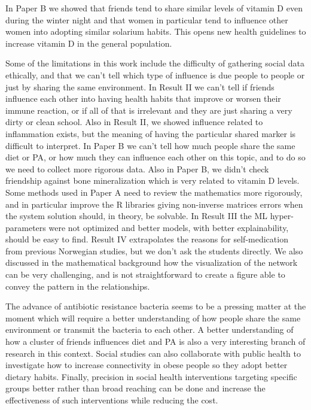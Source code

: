 In Paper B we showed that friends tend to share similar levels of vitamin D even during the winter night and that women in particular tend to influence other women into adopting similar solarium habits. This opens new health guidelines to increase vitamin D in the general population.


Some of the limitations in this work include the difficulty of gathering social data ethically, and that we can't tell which type of influence is due people to people or just by sharing the same environment. In Result II we can't tell if friends influence each other into having health habits that improve or worsen their immune reaction, or if all of that is irrelevant and they are just sharing a very dirty or clean school. Also in Result II, we showed influence related to inflammation exists, but the meaning of having the particular shared marker is difficult to interpret. In Paper B we can't tell how much people share the same diet or PA, or how much they can influence each other on this topic, and to do so we need to collect more rigorous data. Also in Paper B, we didn't check friendship against bone mineralization which is very related to vitamin D levels. Some methods used in Paper A need to review the mathematics more rigorously, and in particular improve the R libraries giving non-inverse matrices errors when the system solution should, in theory, be solvable. In Result III the ML hyper-parameters were not optimized and better models, with better explainability, should be easy to find. Result IV extrapolates the reasons for self-medication from previous Norwegian studies, but we don't ask the students directly. We also discussed in the mathematical background how the visualization of the network can be very challenging, and is not straightforward to create a figure able to convey the pattern in the relationships. 



The advance of antibiotic resistance bacteria seems to be a pressing matter at the moment which will require a better understanding of how people share the same environment or transmit the bacteria to each other. A better understanding of how a cluster of friends influences diet and PA is also a very interesting branch of research in this context. Social studies can also collaborate with public health to investigate how to increase connectivity in obese people so they adopt better dietary habits. Finally, precision in social health interventions targeting specific groups better rather than broad reaching can be done and increase the effectiveness of such interventions while reducing the cost.
  
